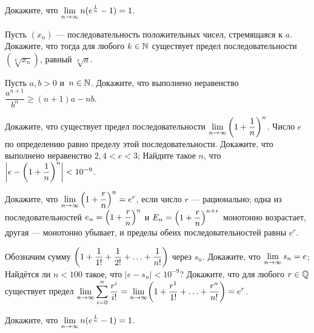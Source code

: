 \documentclass[a4paper, 12pt]{article}
\renewcommand{\spacer}{\vfill}
\begin{document}
Докажите, что $\lim\limits_{n \rightarrow \infty} n(e^{\frac{1}{n}} - 1) = 1$.


\newpage
{}
\renewcommand{\spacer}{\vspace*{3mm}}


\bigskip
{}
Пусть $(x_n)$ --- последовательность положительных чисел, стремящаяся к $a$.
Докажите, что тогда для любого $k\in\mathbb{N}$ существует предел последовательности $(\sqrt[k]{x_n})$,
равный $\sqrt[k]{a}$.





Пусть $a,b>0$ и~$n\in\mathbb{N}$.
Докажите, что выполнено неравенство $\dfrac{a^{n+1}}{b^n}\geqslant(n+1)a-nb$.

Докажите, что существует предел последовательности $\lim\limits_{n \rightarrow \infty}\left(1+\dfrac1n\right)^n$.
Число $e$ по определению равно пределу этой последовательности.
\smallskip
{}
Докажите, что выполнено неравенство $2{,}4<e<3$;
\smallskip
{}
Найдите такое $n$, что $\left|e - \left(1+\dfrac1n\right)^n\right| < 10^{-9}$.

\label{e2e}
Докажите, что
\smallskip
{}
$\lim\limits_{n \rightarrow \infty}\left(1+\dfrac{r}{n}\right)^n = e^r$, если число $r$ --- рационально;
\smallskip
{}
одна из последовательностей $e_n=\left(1+\dfrac{r}{n}\right)^n$ и $E_n = \left(1+\dfrac{r}{n}\right)^{n+r}$ монотонно возрастает,
другая --- монотонно убывает, и пределы обеих последовательностей равны $e^r$.

Обозначим сумму $\biggl( 1 + \dfrac{1}{1!} + \dfrac{1}{2!} + \ldots +  \dfrac{1}{n!}\biggr)$ через $s_n$.
\smallskip
{}
Докажите, что $\lim\limits_{n \rightarrow \infty} s_n = e$;
\smallskip
{}
Найдётся ли $n < 100$ такое, что $|e - s_n| < 10^{-9}$?
\smallskip
{}
Докажите, что для любого $r\in\mathbb{Q}$ существует предел
\vspace{-4mm}
$\displaystyle
\lim\limits_{n \rightarrow \infty} \sum\limits_{i=0}^{n} \dfrac{r^i}{i!} =
\lim\limits_{n \rightarrow \infty} \biggl( 1 + \dfrac{r^1}{1!} + \ldots +  \dfrac{r^n}{n!}\biggr) = e^r
$.

Докажите, что $\lim\limits_{n \rightarrow \infty} n(e^{\frac{1}{n}} - 1) = 1$.

\end{document}
